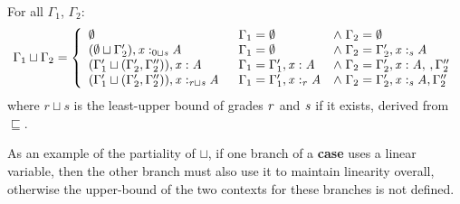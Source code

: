 \begin{definition}\label{def:context-lub}
For all $\Gamma_{{\mathrm{1}}}$, $\Gamma_{{\mathrm{2}}}$:
\begin{align*}
\label{def:lub}
\Gamma_{{\mathrm{1}}} \sqcup \Gamma_{{\mathrm{2}}} =
\left\{\begin{matrix}
\begin{array}{lll}
\emptyset
  & \Gamma_{{\mathrm{1}}} = \emptyset & \wedge \; \Gamma_{{\mathrm{2}}} = \emptyset
\\
%
(\emptyset \sqcup \Gamma'_{{\mathrm{2}}}), \GRANULEmv{x}  :_{\textcolor{coeffectColor}{     0   \sqcup  \GRANULEnt{s}    } }   \GRANULEnt{A}
  & \Gamma_{{\mathrm{1}}} = \emptyset & \wedge \; \Gamma_{{\mathrm{2}}} = \Gamma'_{{\mathrm{2}}}  \GRANULEsym{,}   \GRANULEmv{x}  :_{\textcolor{coeffectColor}{  \GRANULEnt{s}  } }   \GRANULEnt{A}
\\
%
(\Gamma'_{{\mathrm{1}}} \sqcup \GRANULEsym{(}  \Gamma'_{{\mathrm{2}}}  \GRANULEsym{,}  \Gamma''_{{\mathrm{2}}}  \GRANULEsym{)}), \GRANULEmv{x}  :  \GRANULEnt{A}
 & \Gamma_{{\mathrm{1}}} = \Gamma'_{{\mathrm{1}}}  \GRANULEsym{,}   \GRANULEmv{x}  :  \GRANULEnt{A} & \wedge \; \Gamma_{{\mathrm{2}}} = \Gamma'_{{\mathrm{2}}}  \GRANULEsym{,}   \GRANULEmv{x}  :  \GRANULEnt{A}    \GRANULEsym{,}  \,  \GRANULEsym{,}  \Gamma''_{{\mathrm{2}}}
\\
%
(\Gamma'_{{\mathrm{1}}} \sqcup \GRANULEsym{(}  \Gamma'_{{\mathrm{2}}}  \GRANULEsym{,}  \Gamma''_{{\mathrm{2}}}  \GRANULEsym{)}), \GRANULEmv{x}  :_{\textcolor{coeffectColor}{    \GRANULEnt{r}  \sqcup  \GRANULEnt{s}    } }   \GRANULEnt{A}\;\;
 & \Gamma_{{\mathrm{1}}} = \Gamma'_{{\mathrm{1}}}  \GRANULEsym{,}   \GRANULEmv{x}  :_{\textcolor{coeffectColor}{  \GRANULEnt{r}  } }   \GRANULEnt{A} & \wedge \; \Gamma_{{\mathrm{2}}} = \Gamma'_{{\mathrm{2}}}  \GRANULEsym{,}   \GRANULEmv{x}  :_{\textcolor{coeffectColor}{  \GRANULEnt{s}  } }   \GRANULEnt{A}    \GRANULEsym{,}  \Gamma''_{{\mathrm{2}}}
\end{array}
\end{matrix}\right.
\end{align*}
where $r\!\sqcup\!s$ is the least-upper bound of grades $\mathit{r}$
and $\mathit{s}$ if it exists, derived from $\sqsubseteq$.
\end{definition}
%
As an example of the partiality of $\sqcup$, if one branch of a \textbf{case} uses a linear variable,
then the other branch must also use it to maintain linearity overall,
otherwise the upper-bound of the two contexts for these branches is not defined.

